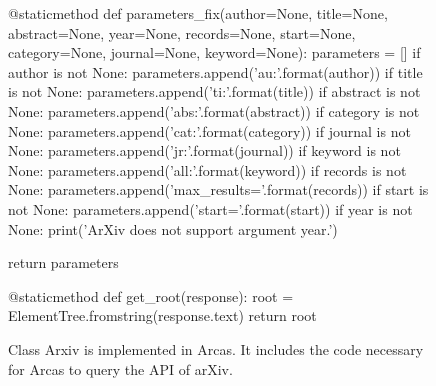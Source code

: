 \begin{figure}[!hbtp]
\begin{sourcepy}
    @staticmethod
    def parameters_fix(author=None, title=None, abstract=None, year=None, records=None,
                       start=None, category=None, journal=None, keyword=None):
        parameters = []
        if author is not None:
            parameters.append('au:{}'.format(author))
        if title is not None:
            parameters.append('ti:{}'.format(title))
        if abstract is not None:
            parameters.append('abs:{}'.format(abstract))
        if category is not None:
            parameters.append('cat:{}'.format(category))
        if journal is not None:
            parameters.append('jr:{}'.format(journal))
        if keyword is not None:
            parameters.append('all:{}'.format(keyword))
        if records is not None:
            parameters.append('max_results={}'.format(records))
        if start is not None:
            parameters.append('start={}'.format(start))
        if year is not None:
            print('ArXiv does not support argument year.')

        return parameters

    @staticmethod
    def get_root(response):
        root = ElementTree.fromstring(response.text)
        return root
\end{sourcepy}
\caption{Class Arxiv is implemented in Arcas. It includes the code necessary for Arcas
to query the API of arXiv.}\label{fig:arcas_arxiv}
\end{figure}

